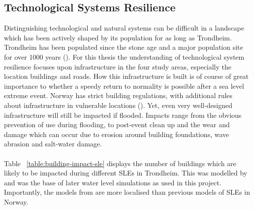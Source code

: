 \subsection{Technological Systems Resilience}
Distinguishing technological and natural systems can be difficult in a landscape which has been actively shaped by its population for as long as Trondheim. Trondheim has been populated since the stone age and a major population site for over 1000 years (\cite{sjavik_z_2010}). For this thesis the understanding of technological system resilience focuses upon infrastructure in the four study areas, especially the location buildings and roads. How this infrastructure is built is of course of great importance to whether a speedy return to normality is possible after a sea level extreme event. Norway has strict building regulations, with additional rules about infrastructure in vulnerable locations (\cite{direktoratet_for_byggkvalitet_direktoratet_2016}). Yet, even very well-designed infrastructure will still be impacted if flooded. Impacts range from the obvious prevention of use during flooding, to post-event clean up and the wear and damage which can occur due to  erosion around building foundations, wave abrasion and salt-water damage.
\paragraph{}
Table ~\ref{table:building-impact-sle} displays the number of buildings which are likely to be impacted during different SLEs in Trondheim. This was modelled by \cite{kartverket_se_2021} and was the base of later water level simulations as used in this project. Importantly, the models from \cite{kartverket_se_2021} are more localised than previous models of SLEs in Norway.


